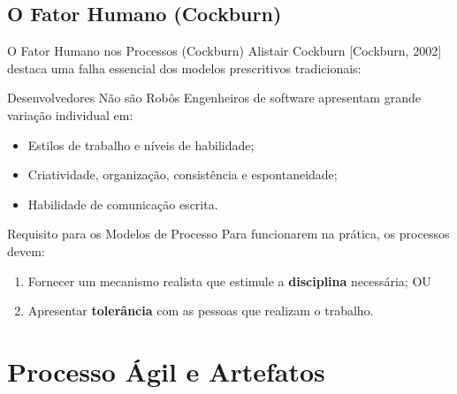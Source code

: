 \documentclass[aspectratio=169, 9pt]{beamer}
\begin{document}
\subsection{O Fator Humano (Cockburn)}
\begin{frame}{O Fator Humano nos Processos (Cockburn)}
  Alistair Cockburn [Cockburn, 2002] destaca uma falha essencial dos modelos prescritivos tradicionais:

  \vspace{0.2cm}
  \begin{alertblock}{Desenvolvedores Não são Robôs}
    Engenheiros de software apresentam grande variação individual em:
    \begin{itemize}
      \item Estilos de trabalho e níveis de habilidade;
      \item Criatividade, organização, consistência e espontaneidade;
      \item Habilidade de comunicação escrita.
    \end{itemize}
  \end{alertblock}

  \vspace{0.2cm}
  \begin{block}{Requisito para os Modelos de Processo}
    Para funcionarem na prática, os processos devem:
    \begin{enumerate}
      \item Fornecer um mecanismo realista que estimule a \textbf{disciplina} necessária; OU
      \item Apresentar \textbf{tolerância} com as pessoas que realizam o trabalho.
    \end{enumerate}
  \end{block}
\end{frame}


\section{Processo Ágil e Artefatos}
\end{document}
